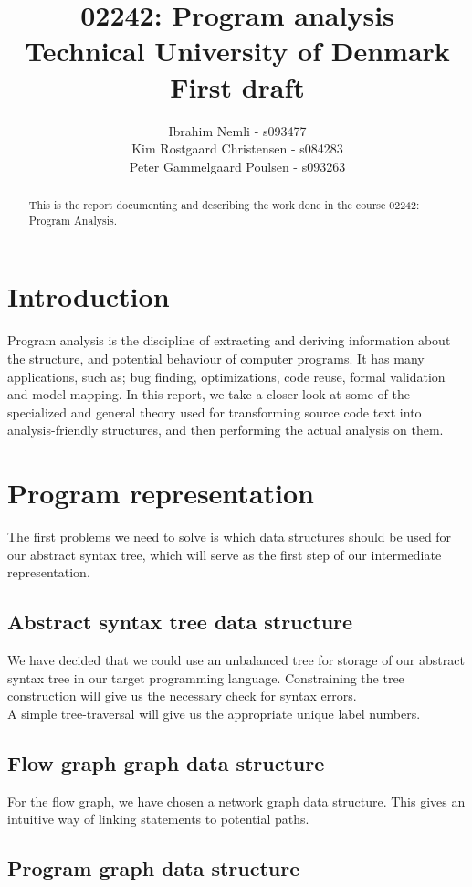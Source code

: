 \documentclass[12pt]{article}
\title{02242: Program analysis \\ 
		\medskip \large{Technical University of Denmark} \\ \medskip  \large{First draft}}
\author{Ibrahim Nemli - s093477 \\
        Kim Rostgaard Christensen - s084283\\
        Peter Gammelgaard Poulsen - s093263}
\begin{document}
\maketitle
 
\begin{abstract}
This is the report documenting and describing the work done in the course 02242: Program Analysis.
\end{abstract}

\section{Introduction}
Program analysis is the discipline of extracting and deriving information about the structure, and potential behaviour of computer programs. It has many applications, such as; bug finding, optimizations, code reuse, formal validation and model mapping. In this report, we take a closer look at some of the specialized and general theory used for transforming source code text into analysis-friendly structures, and then performing the actual analysis on them.

\section{Program representation}
The first problems we need to solve is which data structures should be used for our abstract syntax tree, which will serve as the first step of our intermediate representation.

\subsection{Abstract syntax tree data structure}
We have decided that we could use an unbalanced tree for storage of our abstract syntax tree in our target programming language. Constraining the tree construction will give us the necessary check for syntax errors.\\
A simple tree-traversal will give us the appropriate unique label numbers.
\subsection{Flow graph graph data structure}
For the flow graph, we have chosen a network graph data structure. This gives an intuitive way of linking statements to potential paths.

\subsection{Program graph data structure} %
\end{document}
